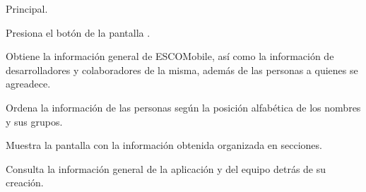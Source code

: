 	\begin{UCtrayectoria}{Principal.}

		\UCpaso[\UCactor] Presiona el botón  de la pantalla .

		\UCpaso Obtiene la información general de ESCOMobile, así como la información de desarrolladores y colaboradores
		de la misma, además de las personas a quienes se agreadece. 

		\UCpaso Ordena la información de las personas según la posición alfabética de los nombres y sus grupos. 

		\UCpaso Muestra la pantalla  con la información
		obtenida organizada en secciones. 

		\UCpaso [\UCactor] Consulta la información general de la aplicación y del equipo detrás de su creación.

	\end{UCtrayectoria}



